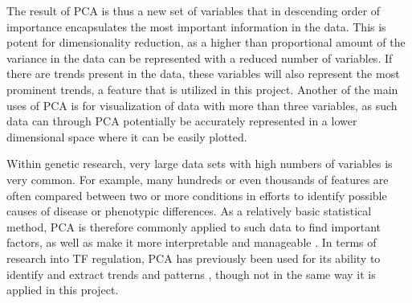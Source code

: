 The result of \ac{PCA} is thus a new set of variables that in descending order of importance encapsulates the most important information in the data. This is potent for dimensionality reduction, as a higher than proportional amount of the variance in the data can be represented with a reduced number of variables. If there are trends present in the data, these variables will also represent the most prominent trends, a feature that is utilized in this project. Another of the main uses of \ac{PCA} is for visualization of data with more than three variables, as such data can through \ac{PCA} potentially be accurately represented in a lower dimensional space where it can be easily plotted.

Within genetic research, very large data sets with high numbers of variables is very common. For example, many hundreds or even thousands of features are often compared between two or more conditions in efforts to identify possible causes of disease or phenotypic differences. As a relatively basic statistical method, \ac{PCA} is therefore commonly applied to such data to find important factors, as well as make it more interpretable and manageable \cite{Sevy2019, Ellsworth2017, Ji2013, Taguchi2018, Li2019}. In terms of research into \ac{TF} regulation, \ac{PCA} has previously been used for its ability to identify and extract trends and patterns \cite{Ouyanga2009}, though not in the same way it is applied in this project.
